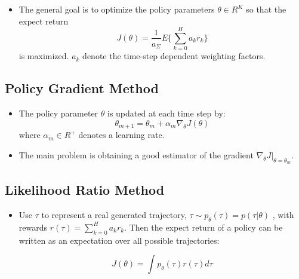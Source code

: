 {\begin{pcolumn}
{\begin{itemize}
	\item The general goal is to optimize the policy parameters $\theta \in R^K$ so that the expect return 
\begin{equation}
	J(\theta) = \frac{1}{a_\Sigma} E \{\sum_{k=0}^H a_k r_k\}
\end{equation}
is maximized. $a_k$ denote the time-step dependent weighting factors.
\end{itemize}
\vspace*{2mm}
}

\subsection{Policy Gradient Method}
\vspace*{-17mm}
%
{\large
\begin{itemize}
	\item The policy parameter $\theta$ is updated at each time step by:
\begin{equation}
	\theta_{m+1} = \theta_m + \alpha_m \nabla_\theta J(\theta)
\end{equation}
where $\alpha_m \in R^+$ denotes a learning rate.
	\item The main problem is obtaining a good estimator of the gradient $\nabla_\theta J |_{\theta=\theta_m}$.
\end{itemize}
}

\subsection{Likelihood Ratio Method}
\vspace*{-17mm}
{\large
%
\begin{itemize}
	\item Use $\tau$ to represent a real generated trajectory, $\tau \sim p_\theta(\tau) = p(\tau | \theta)$ , with rewards $r(\tau) = \sum_{k=0}^H a_k r_k$. Then the expect return of a policy can be written as an expectation over all possible trajectories:

\begin{equation}
	J(\theta) = \int p_\theta(\tau) r(\tau) d\tau
\end{equation}


\end{itemize}}
\end{pcolumn}}
